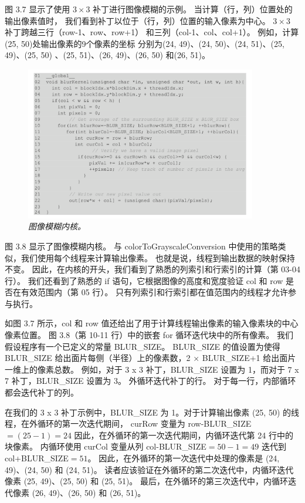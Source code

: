 图 3.7 显示了使用 $3 \times 3$ 补丁进行图像模糊的示例。 当计算（行，列）位置处的输出像素值时，
我们看到补丁以位于（行，列）位置的输入像素为中心。 $3 \times 3$ 补丁跨越三行（row-1、row、row+1）
和三列（col-1、col、col+1）。 例如，计算(25, 50)处输出像素的9个像素的坐标
分别为(24, 49)、(24, 50)、(24, 51)、(25, 49)、(25, 50) 、(25, 51)、(26, 49)、(26, 50) 和(26, 51)。

\begin{figure}[H]
	\centering
	\includegraphics[width=0.9\textwidth]{figs/F3.8.png}
	\caption{\textit{图像模糊内核。}}
\end{figure}

图 3.8 显示了图像模糊内核。 与 colorToGrayscaleConversion 中使用的策略类似，我们使用每个线程来计算输出像素。 
也就是说，线程到输出数据的映射保持不变。 因此，在内核的开头，我们看到了熟悉的列索引和行索引的计算（第 03-04 行）。 
我们还看到了熟悉的 if 语句，它根据图像的高度和宽度验证 col 和 row 是否在有效范围内（第 05 行）。 
只有列索引和行索引都在值范围内的线程才允许参与执行。

如图 3.7 所示，col 和 row 值还给出了用于计算线程输出像素的输入像素块的中心像素位置。 
图 3.8（第 10-11 行）中的嵌套 for 循环迭代块中的所有像素。 我们假设程序有一个已定义的常量 BLUR\_SIZE。 
BLUR\_SIZE 的值设置为使得 BLUR\_SIZE 给出面片每侧（半径）上的像素数，2 × BLUR\_SIZE+1 给出面片一维上的像素总数。 
例如，对于 3 x 3 补丁，BLUR\_SIZE 设置为 1，而对于 7 x 7 补丁，BLUR\_SIZE 设置为 3。
外循环迭代补丁的行。 对于每一行，内部循环都会迭代补丁的列。

在我们的 3 x 3 补丁示例中，BLUR\_SIZE 为 1。对于计算输出像素 (25, 50) 的线程，在外循环的第一次迭代期间，
curRow 变量为 row-BLUR\_SIZE$ = (25 - 1) = 24$ 因此，在外循环的第一次迭代期间，内循环迭代第 24 行中的块像素。
内循环使用 curCol 变量从列 col-BLUR\_SIZE$ = 50 - 1 = 49$ 迭代到 col+BLUR\_SIZE$ = 51$。 
因此，在外循环的第一次迭代中处理的像素是 (24, 49)、(24, 50) 和 (24, 51)。 
读者应该验证在外循环的第二次迭代中，内循环迭代像素 (25, 49)、(25, 50) 和 (25, 51)。 
最后，在外循环的第三次迭代中，内循环迭代像素 (26, 49)、(26, 50) 和 (26, 51)。

